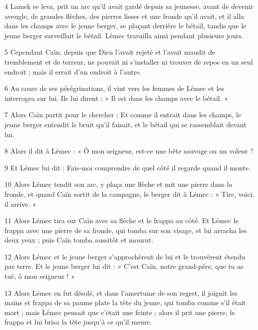 \par 4 Lamek se leva, prit un arc qu'il avait gardé depuis sa jeunesse, avant de devenir aveugle, de grandes flèches, des pierres lisses et une fronde qu'il avait, et il alla dans les champs avec le jeune berger, se plaçant derrière le bétail, tandis que le jeune berger surveillait le bétail. Lémec travailla ainsi pendant plusieurs jours.

\par 5 Cependant Caïn, depuis que Dieu l'avait rejeté et l'avait maudit de tremblement et de terreur, ne pouvait ni s'installer ni trouver de repos en un seul endroit ; mais il errait d'un endroit à l'autre.

\par 6 Au cours de ses pérégrinations, il vint vers les femmes de Lémec et les interrogea sur lui. Ils lui dirent : « Il est dans les champs avec le bétail. »

\par 7 Alors Caïn partit pour le chercher ; Et comme il entrait dans les champs, le jeune berger entendit le bruit qu'il faisait, et le bétail qui se rassemblait devant lui.

\par 8 Alors il dit à Lémec : « Ô mon seigneur, est-ce une bête sauvage ou un voleur ?

\par 9 Et Lémec lui dit : Fais-moi comprendre de quel côté il regarde quand il monte.

\par 10 Alors Lémec tendit son arc, y plaça une flèche et mit une pierre dans la fronde, et quand Caïn sortit de la campagne, le berger dit à Lémec : « Tire, voici, il arrive. »

\par 11 Alors Lémec tira sur Caïn avec sa flèche et le frappa au côté. Et Lémec le frappa avec une pierre de sa fronde, qui tomba sur son visage, et lui arracha les deux yeux ; puis Caïn tomba aussitôt et mourut.

\par 12 Alors Lémec et le jeune berger s'approchèrent de lui et le trouvèrent étendu par terre. Et le jeune berger lui dit : « C'est Caïn, notre grand-père, que tu as tué, ô mon seigneur ! »

\par 13 Alors Lémec en fut désolé, et dans l'amertume de son regret, il joignit les mains et frappa de sa paume plate la tête du jeune, qui tomba comme s'il était mort ; mais Lémec pensait que c'était une feinte ; alors il prit une pierre, le frappa et lui brisa la tête jusqu'à ce qu'il meure.

